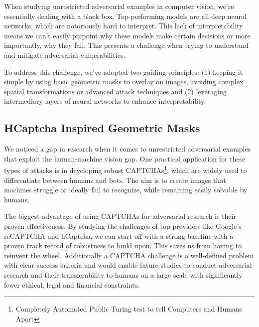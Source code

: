 \documentclass[a4paper, oneside]{discothesis}
\begin{document}
When studying unrestricted adversarial examples in computer vision, we're essentially dealing with a black box. Top-performing models are all deep neural networks, which are notoriously hard to interpret. This lack of interpretability means we can't easily pinpoint why these models make certain decisions or more importantly, why they fail. This presents a challenge when trying to understand and mitigate adversarial vulnerabilities.

To address this challenge, we've adopted two guiding principles: (1) keeping it simple by using basic geometric masks to overlay on images, avoiding complex spatial transformations or advanced attack techniques and (2) leveraging intermediary layers of neural networks to enhance interpretability.

\subsection{HCaptcha Inspired Geometric Masks}

We noticed a gap in research when it comes to unrestricted adversarial examples that exploit the human-machine vision gap. One practical application for these types of attacks is in developing robust CAPTCHAs\footnote{Completely Automated Public Turing test to tell Computers and Humans Apart}, which are widely used to differentiate between humans and bots. The aim is to create images that machines struggle or ideally fail to recognize, while remaining easily solvable by humans.

The biggest advantage of using CAPTCHAs for adversarial research is their proven effectiveness. By studying the challenges of top providers like Google's reCAPTCHA and hCaptcha, we can start off with a strong baseline \textendash{} with a proven track record of robustness \textendash{} to build upon. This saves us from having to reinvent the wheel. Additionally a CAPTCHA challenge is a well-defined problem with clear success criteria and would enable future studies to conduct adversarial research and their transferability to humans on a large scale with significantly fewer ethical, legal and financial constraints.
\end{document}
